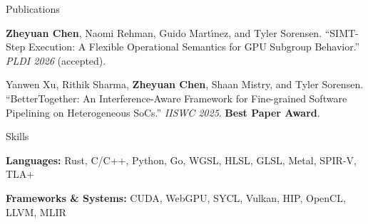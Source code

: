 \documentclass{resume}
\begin{document}
\begin{rSection}{Publications}

\item \textbf{Zheyuan Chen}, Naomi Rehman, Guido Mart\'{\i}nez, and Tyler Sorensen. ``SIMT-Step Execution: A Flexible Operational Semantics for GPU Subgroup Behavior.'' \textit{PLDI 2026} (accepted).

\item Yanwen Xu, Rithik Sharma, \textbf{Zheyuan Chen}, Shaan Mistry, and Tyler Sorensen. ``BetterTogether: An Interference-Aware Framework for Fine-grained Software Pipelining on Heterogeneous SoCs.'' \textit{IISWC 2025}. \textbf{Best Paper Award}.

\end{rSection}

\begin{rSection}{Skills}

\item \textbf{Languages:} Rust, C/C++, Python, Go, WGSL, HLSL, GLSL, Metal, SPIR-V, TLA+
\item \textbf{Frameworks \& Systems:} CUDA, WebGPU, SYCL, Vulkan, HIP, OpenCL, LLVM, MLIR

\end{rSection}
\end{document}
